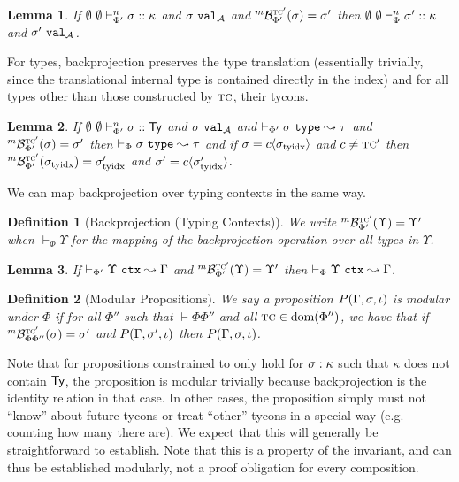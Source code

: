 \documentclass[12pt]{article}
\newtheorem{lemma}{Lemma}
\newtheorem{definition}{Definition}
\begin{document}
\begin{lemma}
If $\emptyset~\emptyset \vdash_{\Phi'}^{n} \sigma :: \kappa$ and $\sigma~\mathtt{val}_{\mathcal{A}}$ and ${}^{m}\mathcal{B}_{\Phi'}^{\textsc{tc}'}(\sigma)=\sigma'$ then $\emptyset~\emptyset \vdash_{\Phi}^{n} \sigma' :: \kappa$ and $\sigma'~\mathtt{val}_{\mathcal{A}}$.
\end{lemma}

For types, backprojection preserves the type translation (essentially trivially, since the translational internal type is contained directly in the index) and for all types other than those constructed by $\textsc{tc}$, their tycons.

\begin{lemma}
If $\emptyset~\emptyset \vdash_{\Phi'}^{n} \sigma :: {\sf Ty}$ and $\sigma~\mathtt{val}_{\mathcal{A}}$ and $\vdash_{\Phi'} \sigma~\mathtt{type} \leadsto \tau$ and ${}^{m}\mathcal{B}_{\Phi'}^{\textsc{tc}'}(\sigma)=\sigma'$ then $\vdash_{\Phi} \sigma~\mathtt{type} \leadsto \tau$ and if $\sigma={c}\langle\sigma_\text{tyidx}\rangle$ and $c\neq\textsc{tc}'$ then ${}^{m}\mathcal{B}_{\Phi'}^{\textsc{tc}'}(\sigma_\text{tyidx})=\sigma_\text{tyidx}'$ and $\sigma'={c}\langle\sigma_\text{tyidx}'\rangle$.
\end{lemma}

We can map backprojection over typing contexts in the same way.
\begin{definition}[Backprojection (Typing Contexts)]
We write ${}^{m}\mathcal{B}_{\Phi'}^{\textsc{tc}'}(\Upsilon)=\Upsilon'$ when $\vdash_\Phi \Upsilon$ for the mapping of the backprojection operation over all types in $\Upsilon$.
\end{definition}

\begin{lemma} 
If $\vdash_{\Phi'} \Upsilon~\mathtt{ctx} \leadsto \Gamma$ and ${}^{m}\mathcal{B}_{\Phi'}^{\textsc{tc}'}(\Upsilon)=\Upsilon'$ then $\vdash_{\Phi} \Upsilon~\mathtt{ctx} \leadsto \Gamma$.
\end{lemma}

\begin{definition}[Modular Propositions]
We say a proposition $P(\Gamma, \sigma, \iota)$ is \emph{modular} under $\Phi$ if for all $\Phi''$ such that $\vdash \Phi\Phi''$ and all $\textsc{tc} \in \text{dom}(\Phi'')$, we have that if ${}^{m}\mathcal{B}_{\Phi\Phi''}^{\textsc{tc}'}(\sigma)=\sigma'$ and $P(\Gamma, \sigma', \iota)$ then $P(\Gamma, \sigma, \iota)$.
\end{definition} 

Note that for propositions constrained to only hold for $\sigma : \kappa$ such that $\kappa$ does not contain ${\sf Ty}$, the proposition is modular trivially because backprojection is the identity relation in that case. In other cases, the proposition simply must not ``know'' about future tycons or treat ``other'' tycons in a special way (e.g. counting how many there are). We expect that this will generally be straightforward to establish. Note that this is a property of the invariant, and can thus be established modularly, not a proof obligation for every composition.
\end{document}
